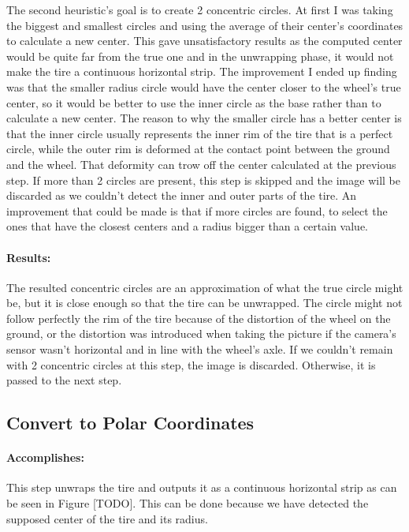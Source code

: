 The second heuristic's goal is to create 2 concentric circles. At first I was taking the biggest and smallest circles and using the average of their center's coordinates to calculate a new center. This gave unsatisfactory results as the computed center would be quite far from the true one and in the unwrapping phase, it would not make the tire a continuous horizontal strip. The improvement I ended up finding was that the smaller radius circle would have the center closer to the wheel's true center, so it would be better to use the inner circle as the base rather than to calculate a new center. The reason to why the smaller circle has a better center is that the inner circle usually represents the inner rim of the tire that is a perfect circle, while the outer rim is deformed at the contact point between the ground and the wheel. That deformity can trow off the center calculated at the previous step. If more than 2 circles are present, this step is skipped and the image will be discarded as we couldn't detect the inner and outer parts of the tire. An improvement that could be made is that if more circles are found, to select the ones that have the closest centers and a radius bigger than a certain value.

\paragraph*{Results:}\mbox{}\par
The resulted concentric circles are an approximation of what the true circle might be, but it is close enough so that the tire can be unwrapped. The circle might not follow perfectly the rim of the tire because of the distortion of the wheel on the ground, or the distortion was introduced when taking the picture if the camera's sensor wasn't horizontal and in line with the wheel's axle. If we couldn't remain with 2 concentric circles at this step, the image is discarded. Otherwise, it is passed to the next step.

\subsection{Convert to Polar Coordinates}
\label{subsec:convert_to_polar}

\paragraph*{Accomplishes:}\mbox{}\par
This step unwraps the tire and outputs it as a continuous horizontal strip as can be seen in Figure [TODO]. This can be done because we have detected the supposed center of the tire and its radius.

